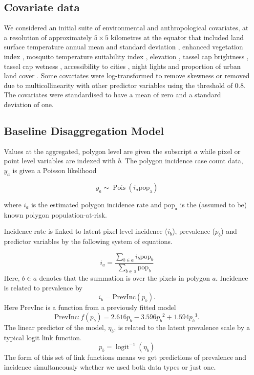 \documentclass{statsoc}
\begin{document}
\subsection*{Covariate data}

We considered an initial suite of environmental and anthropological covariates, at a resolution of approximately $5 \times 5$ kilometres at the equator that included land surface temperature annual mean and standard deviation \citep{LST}, enhanced vegetation index \citep{TCB}, mosquito temperature suitability index \citep{weiss2014air}, elevation \citep{SRTMElev}, tassel cap brightness \citep{TCB}, tassel cap wetness \citep{TCB}, accessibility to cities \citep{weiss2018global}, night lights \citep{elvidge2017viirs} and proportion of urban land cover \citep{GUF}. %
Some covariates were log-transformed to remove skewness or removed due to multicollinearity with other predictor variables using the threshold of 0.8. %
The covariates were standardised to have a mean of zero and a standard deviation of one.



\subsection*{Baseline Disaggregation Model}

Values at the aggregated, polygon level are given the subscript $a$ while pixel or point level variables are indexed with $b$.
The polygon incidence case count data, $y_a$ is given a Poisson likelihood

$$y_a \sim \operatorname{Pois}(i_a\mathrm{pop_a})$$

where $i_a$ is the estimated polygon incidence rate and $\mathrm{pop_a}$ is the (assumed to be) known polygon population-at-risk.


Incidence rate is linked to latent pixel-level incidence ($i_b$), prevalence ($p_b$) and predictor variables by the following system of equations.

$$i_a = \frac{ \sum_{b \in a}i_b \mathrm{pop}_b}{\sum_{b \in a}\mathrm{pop}_b} $$
Here, $b \in a$ denotes that the summation is over the pixels in polygon $a$. 
Incidence is related to prevalence by
$$i_b = \mathrm{PrevInc}(p_b).$$
Here $\mathrm{PrevInc}$ is a function from a previously fitted model \citep{cameron2015defining} 
$$\mathrm{PrevInc}: f\left(p_b\right) = 2.616p_b - 3.596{p_b}^2 + 1.594{p_b}^3.$$
The linear predictor of the model, $\eta_b$, is related to the latent prevalence scale by a typical logit link function.
$$p_b = \operatorname{logit}^{-1}(\eta_b)$$
The form of this set of link functions means we get predictions of prevalence and incidence simultaneously whether we used both data types or just one.
\end{document}
